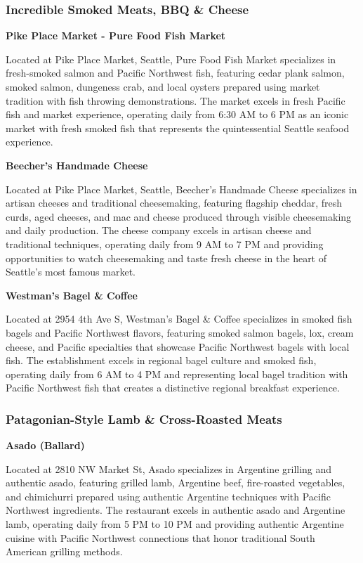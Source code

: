 \documentclass[
  11pt,
  letterpaper,
  DIV=10,
  numbers=noendperiod]{scrartcl}
\begin{document}
\subsubsection{Incredible Smoked Meats, BBQ \&
Cheese}\label{incredible-smoked-meats-bbq-cheese-5}

\textbf{Pike Place Market - Pure Food Fish Market}

Located at Pike Place Market, Seattle, Pure Food Fish Market specializes
in fresh-smoked salmon and Pacific Northwest fish, featuring cedar plank
salmon, smoked salmon, dungeness crab, and local oysters prepared using
market tradition with fish throwing demonstrations. The market excels in
fresh Pacific fish and market experience, operating daily from 6:30 AM
to 6 PM as an iconic market with fresh smoked fish that represents the
quintessential Seattle seafood experience.

\textbf{Beecher's Handmade Cheese}

Located at Pike Place Market, Seattle, Beecher's Handmade Cheese
specializes in artisan cheeses and traditional cheesemaking, featuring
flagship cheddar, fresh curds, aged cheeses, and mac and cheese produced
through visible cheesemaking and daily production. The cheese company
excels in artisan cheese and traditional techniques, operating daily
from 9 AM to 7 PM and providing opportunities to watch cheesemaking and
taste fresh cheese in the heart of Seattle's most famous market.

\textbf{Westman's Bagel \& Coffee}

Located at 2954 4th Ave S, Westman's Bagel \& Coffee specializes in
smoked fish bagels and Pacific Northwest flavors, featuring smoked
salmon bagels, lox, cream cheese, and Pacific specialties that showcase
Pacific Northwest bagels with local fish. The establishment excels in
regional bagel culture and smoked fish, operating daily from 6 AM to 4
PM and representing local bagel tradition with Pacific Northwest fish
that creates a distinctive regional breakfast experience.

\subsubsection{Patagonian-Style Lamb \& Cross-Roasted
Meats}\label{patagonian-style-lamb-cross-roasted-meats-5}

\textbf{Asado (Ballard)}

Located at 2810 NW Market St, Asado specializes in Argentine grilling
and authentic asado, featuring grilled lamb, Argentine beef,
fire-roasted vegetables, and chimichurri prepared using authentic
Argentine techniques with Pacific Northwest ingredients. The restaurant
excels in authentic asado and Argentine lamb, operating daily from 5 PM
to 10 PM and providing authentic Argentine cuisine with Pacific
Northwest connections that honor traditional South American grilling
methods.
\end{document}
